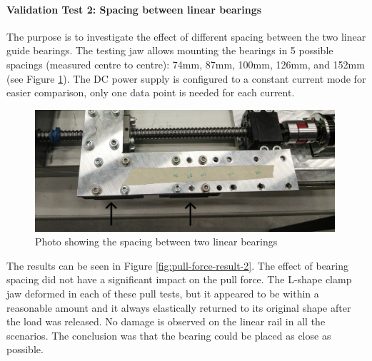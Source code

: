 \FloatBarrier

\paragraph{Validation Test 2: Spacing between linear bearings}

The purpose is to investigate the effect of different spacing between the two linear guide bearings. The testing jaw allows mounting the bearings in 5 possible spacings (measured centre to centre): 74mm, 87mm, 100mm, 126mm, and 152mm (see Figure \ref{fig:pull-force-spacing}). The DC power supply is configured to a constant current mode for easier comparison, only one data point is needed for each current. 

\begin{figure}[!h]
    \centering
    \includegraphics[width=0.99\textwidth]{images/05/image105b.jpg}
    \caption{Photo showing the spacing between two linear bearings}
    \label{fig:pull-force-spacing}
\end{figure}

The results can be seen in Figure \ref{fig:pull-force-result-2}. The effect of bearing spacing did not have a significant impact on the pull force. The L-shape clamp jaw deformed in each of these pull tests, but it appeared to be within a reasonable amount and it always elastically returned to its original shape after the load was released. No damage is observed on the linear rail in all the scenarios. The conclusion was that the bearing could be placed as close as possible.

